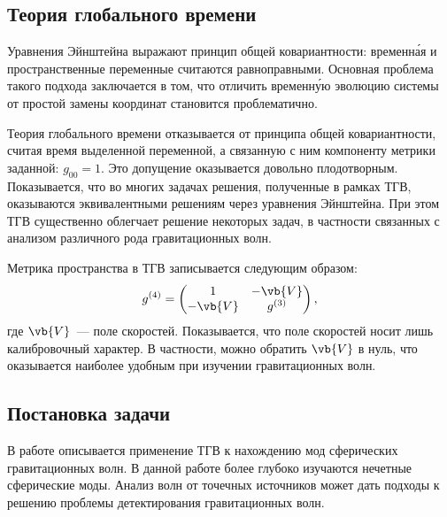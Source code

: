 \documentclass[\docroot/reports/draft/report.tex]{subfiles}
\begin{document}
\onlyinsubfile{\tableofcontents}

\subsection{Теория глобального времени\label{sec:tgt}}

    

    Уравнения Эйнштейна выражают принцип общей ковариантности: временн\'{а}я и пространственные переменные считаются равноправными. Основная проблема такого подхода заключается в том, что отличить временн\'{у}ю эволюцию системы от простой замены координат становится проблематично.

    Теория глобального времени отказывается от принципа общей ковариантности, считая время выделенной переменной, а связанную с ним компоненту метрики заданной: $g_{00} = 1$. Это допущение оказывается довольно плодотворным. Показывается, что во многих задачах решения, полученные в рамках ТГВ, оказываются эквивалентными решениям через уравнения Эйнштейна. При этом ТГВ существенно облегчает решение некоторых задач, в частности связанных с анализом различного рода гравитационных волн.

    Метрика пространства в ТГВ записывается следующим образом:
    \begin{equation*}
        g^{(4)} = \begin{pmatrix}
            1       & -\vb{V} \\
            -\vb{V} & g^{(3)}
        \end{pmatrix},
    \end{equation*}
    где $\vb{V}$~--- поле скоростей. Показывается, что поле скоростей носит лишь калибровочный характер. В частности, можно обратить $\vb{V}$ в нуль, что оказывается наиболее удобным при изучении гравитационных волн.

\subsection{Постановка задачи}

    В работе  описывается применение ТГВ к нахождению мод сферических гравитационных волн. В данной работе более глубоко изучаются нечетные сферические моды. Анализ волн от точечных источников может дать подходы к решению проблемы детектирования гравитационных волн.
\end{document}
